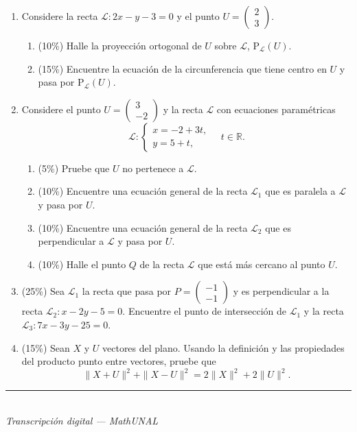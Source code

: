 \documentclass[11pt]{article}
\newcommand{\vect}[2]{\begin{pmatrix}#1\\#2\end{pmatrix}}
\newcommand{\examfooter}{%
  \vfill
  \rule{\linewidth}{0.4pt}\\[1pt]
  {\scriptsize\textit{Transcripción digital --- MathUNAL}\hfill\textcolor{unalblue}{\textbf{\thepage}}}
}
\begin{document}
\begin{enumerate}
\item Considere la recta $\mathcal{L}: 2x-y-3=0$ y el punto $U=\vect{2}{3}$.

\begin{enumerate}[label=(\alph*)]
\item (10\%) Halle la proyección ortogonal de $U$ sobre $\mathcal{L}$, $\mathrm{P}_{\mathcal{L}}(U)$.
\item (15\%) Encuentre la ecuación de la circunferencia que tiene centro en $U$ y pasa por $\mathrm{P}_{\mathcal{L}}(U)$.
\end{enumerate}

\item Considere el punto $U=\vect{3}{-2}$ y la recta $\mathcal{L}$ con ecuaciones paramétricas
$$\mathcal{L}:\begin{cases}x=-2+3t,\\ y=5+t,\end{cases}\quad t\in\mathbb{R}.$$

\begin{enumerate}[label=(\alph*)]
\item (5\%) Pruebe que $U$ no pertenece a $\mathcal{L}$.
\item (10\%) Encuentre una ecuación general de la recta $\mathcal{L}_1$ que es paralela a $\mathcal{L}$ y pasa por $U$.
\item (10\%) Encuentre una ecuación general de la recta $\mathcal{L}_2$ que es perpendicular a $\mathcal{L}$ y pasa por $U$.
\item (10\%) Halle el punto $Q$ de la recta $\mathcal{L}$ que está más cercano al punto $U$.
\end{enumerate}

\item (25\%) Sea $\mathcal{L}_1$ la recta que pasa por $P=\vect{-1}{-1}$ y es perpendicular a la recta $\mathcal{L}_2: x-2y-5=0$. Encuentre el punto de intersección de $\mathcal{L}_1$ y la recta $\mathcal{L}_3: 7x-3y-25=0$.

\item (15\%) Sean $X$ y $U$ vectores del plano. Usando la definición y las propiedades del producto punto entre vectores, pruebe que
$$\|X+U\|^2+\|X-U\|^2=2\|X\|^2+2\|U\|^2.$$

\end{enumerate}

\examfooter
\end{document}
